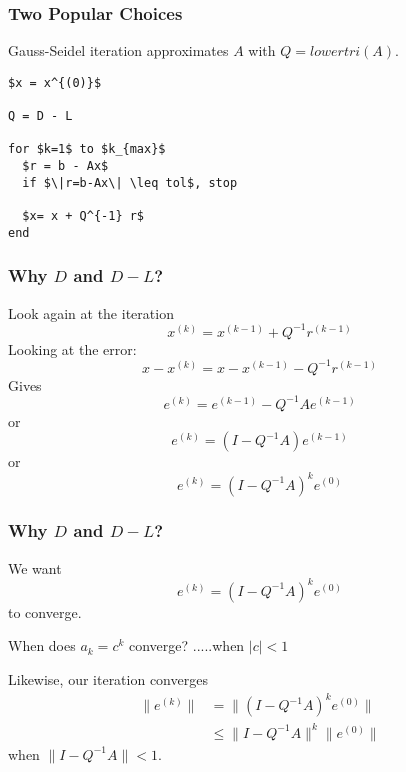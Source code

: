 \documentclass[10pt]{beamer}
\begin{document}
\begin{frame}[fragile]
\frametitle{Two Popular Choices}
\begin{example}
Gauss-Seidel iteration approximates $A$ with $Q=lowertri(A)$.
\bigskip

\begin{lstlisting}[mathescape]
$x = x^{(0)}$

Q = D - L

for $k=1$ to $k_{max}$
  $r = b - Ax$
  if $\|r=b-Ax\| \leq tol$, stop

  $x= x + Q^{-1} r$
end
\end{lstlisting}
\end{example}
\end{frame}
\begin{frame}
\frametitle{Why $D$ and $D-L$?}
Look again at the iteration
\begin{equation*}
	x^{(k)} = x^{(k-1)} + Q^{-1}r^{(k-1)}
\end{equation*}
Looking at the error:
\begin{equation*}
	x-x^{(k)} = x-x^{(k-1)} - Q^{-1}r^{(k-1)}
\end{equation*}
Gives
\begin{equation*}
e^{(k)} = e^{(k-1)} - Q^{-1}Ae^{(k-1)}
\end{equation*}
or
\begin{equation*}
e^{(k)} = (I -  Q^{-1}A) e^{(k-1)}
\end{equation*}
or
\begin{equation*}
e^{(k)} = (I -  Q^{-1}A)^{k} e^{(0)}
\end{equation*}
\end{frame}
\begin{frame}
\frametitle{Why $D$ and $D-L$?}
We want
\begin{equation*}
e^{(k)} = (I -  Q^{-1}A)^{k} e^{(0)}
\end{equation*}
to converge.
\bigskip

When does $a_{k} = c^{k}$ converge?   .....when $|c|<1$
\bigskip

Likewise, our iteration converges
\begin{align*}
\|e^{(k)}\| & = \|(I -  Q^{-1}A)^{k} e^{(0)}\|\\
&\leq \|I-Q^{-1}A\|^{k}\|e^{(0)}\|
\end{align*}
when $\|I-Q^{-1}A\| < 1$.
\end{frame}
\end{document}
